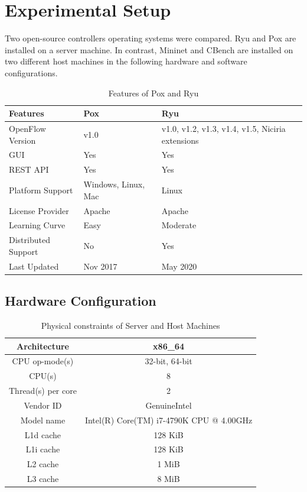 \chapter{Experimental Setup}
Two open-source controllers operating systems were compared. Ryu and Pox are installed on a server machine. In contrast, Mininet and CBench are installed on two different host machines in the following hardware and software configurations.

 \begin{table}[!hbt]
    \centering
    \caption{Features of Pox and Ryu}
    \begin{tabular}{|p{5cm}|p{5cm}|p{5cm}|}
    \hline
         \textbf{Features} & \textbf{Pox} & \textbf{Ryu} \\ \hline
         OpenFlow Version & v1.0 & v1.0, v1.2, v1.3, v1.4, v1.5, Niciria extensions \\ \hline
         GUI & Yes & Yes \\ \hline
         REST API & Yes & Yes \\ \hline
         Platform Support & Windows, Linux, Mac & Linux \\ \hline
    License Provider & Apache & Apache \\ \hline
    Learning Curve & Easy & Moderate \\ \hline
    Distributed Support & No & Yes \\ \hline
    Last Updated & Nov 2017 & May 2020 \\ \hline
    \end{tabular}
    \label{RyuvsPox}
    \end{table}
    
\section{Hardware Configuration}
    \begin{table}[!hbt]
    \centering
    \caption{Physical constraints of Server and Host Machines}
    \begin{tabular}{|c|c|}
    \hline
    Architecture & x86\_64 \\ \hline
         CPU op-mode(s) & 32-bit, 64-bit \\ \hline
         CPU(s) & 8 \\ \hline
         Thread(s) per core & 2 \\ \hline
         Vendor ID & GenuineIntel \\ \hline
    Model name & Intel(R) Core(TM) i7-4790K CPU @ 4.00GHz \\ \hline
    L1d cache & 128 KiB \\ \hline
    L1i cache & 128 KiB \\ \hline
    L2 cache & 1 MiB \\ \hline
    L3 cache & 8 MiB \\ \hline
    \end{tabular}
    \label{Hardware}
    \end{table}


